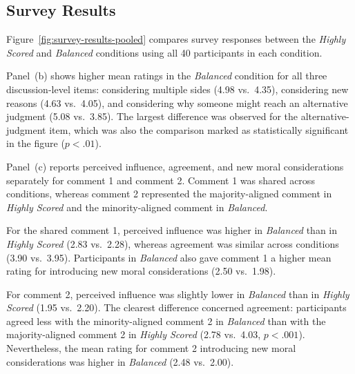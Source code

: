 
\subsection{Survey Results}
\label{subsec:survey-results}


Figure~\ref{fig:survey-results-pooled} compares survey responses between the \textit{Highly Scored} and \textit{Balanced} conditions using all 40 participants in each condition.

Panel~(b) shows higher mean ratings in
the \textit{Balanced} condition for all three discussion-level items:
considering multiple sides (4.98 vs.\ 4.35), considering new reasons
(4.63 vs.\ 4.05), and considering why someone might reach an alternative
judgment (5.08 vs.\ 3.85). The largest difference was observed for the
alternative-judgment item, which was also the comparison marked as
statistically significant in the figure ($p<.01$). 

Panel~(c) reports perceived influence,
agreement, and new moral considerations separately for comment 1 and comment 2.
Comment 1 was shared across conditions, whereas comment 2 represented the
majority-aligned comment in \textit{Highly Scored} and the
minority-aligned comment in \textit{Balanced}.

For the shared comment 1, perceived influence was higher in
\textit{Balanced} than in \textit{Highly Scored} (2.83 vs.\ 2.28),
whereas agreement was similar across conditions
(3.90 vs.\ 3.95). Participants in \textit{Balanced} also gave comment 1 a
higher mean rating for introducing new moral considerations
(2.50 vs.\ 1.98).

For comment 2, perceived influence was slightly lower in \textit{Balanced}
than in \textit{Highly Scored} (1.95 vs.\ 2.20). The clearest
difference concerned agreement: participants agreed less with the
minority-aligned comment 2 in \textit{Balanced} than with the majority-aligned
comment 2 in \textit{Highly Scored} (2.78 vs.\ 4.03, $p<.001$). Nevertheless,
the mean rating for comment 2 introducing new moral considerations was higher
in \textit{Balanced} (2.48 vs.\ 2.00).

